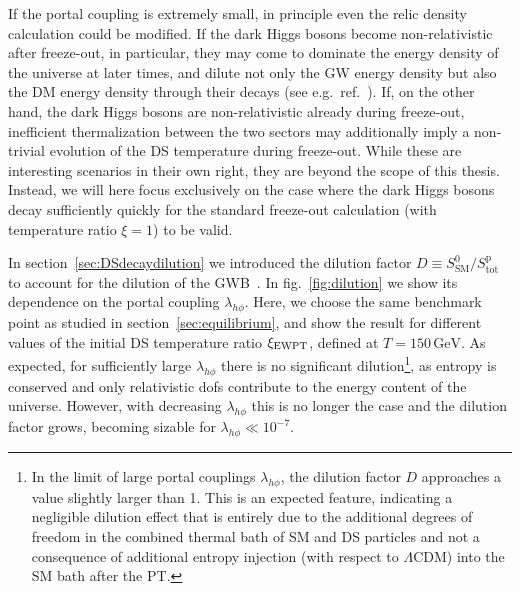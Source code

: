 If the portal coupling is extremely small, in principle even the relic density calculation could be modified. If the dark Higgs bosons become non-relativistic after freeze-out, in particular, they may come to dominate the energy density of the universe at later times, and dilute not only the \ac{GW} energy density but also the \ac{DM} energy density through their decays (see e.g.~ref.~\cite{Berlin:2016gtr}). If, on the other hand, the dark Higgs bosons are non-relativistic already during freeze-out, inefficient thermalization between the two sectors may additionally  imply a non-trivial evolution of the \ac{DS} temperature during freeze-out. While these are interesting scenarios in their own right, they are beyond the scope of  this thesis. Instead, we will here focus exclusively on the case where the dark Higgs bosons decay sufficiently quickly for the standard freeze-out calculation (with temperature ratio $\xi = 1$) to be valid.

In section~\ref{sec:DSdecaydilution} we introduced the dilution factor $D \equiv S_\mathrm{SM}^{0} / S_\mathrm{tot}^\mathrm{p}$ to account for the dilution of the \ac{GWB}~\cite{Cirelli:2018iax, Ertas:2021xeh}. In fig.~\ref{fig:dilution} we show its dependence on the portal coupling $\lambda_{h\phi}$. Here, we choose the same benchmark point as studied in section~\ref{sec:equilibrium}, and show the result for different values of the initial \ac{DS} temperature ratio $\xi_{\text{EWPT}}$, defined at $T= 150\,\text{GeV}$. As expected, for sufficiently large $\lambda_{h\phi}$ there is no significant dilution\footnote{In the limit of large portal couplings $\lambda_{h\phi}$, the dilution factor $D$ approaches a value slightly larger than 1. This is an expected feature, indicating a negligible dilution effect that is entirely due to the additional degrees of freedom in the combined thermal bath of \ac{SM} and \ac{DS} particles and not a consequence of additional entropy injection (with respect to $\Lambda$CDM) into the \ac{SM} bath after the \ac{PT}.},   as entropy is conserved and only relativistic \acp{dof} contribute to the energy content of the universe. However, with decreasing $\lambda_{h\phi}$ this is no longer the case and the dilution factor grows, becoming sizable for $\lambda_{h\phi} \ll 10^{-7}$.

